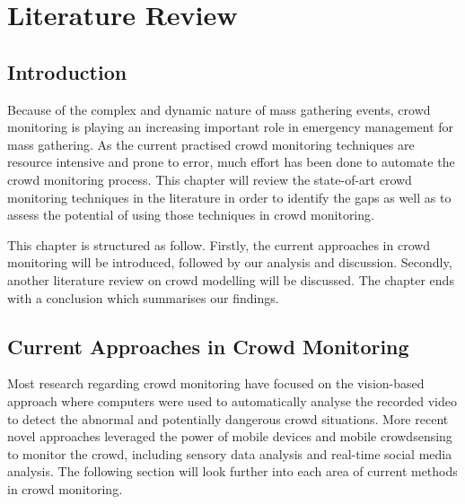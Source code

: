 \chapter{Literature Review}
\label{ch:litReview}
\ifpdf
    \graphicspath{{Chapter2/Figs/Raster/}{Chapter2/Figs/PDF/}{Chapter2/Figs/}}
\else
    \graphicspath{{Chapter2/Figs/Vector/}{Chapter2/Figs/}}
\fi

\section{Introduction}
Because of the complex and dynamic nature of mass gathering events, crowd monitoring is playing an increasing important role in emergency management for mass gathering. As the current practised crowd monitoring techniques are resource intensive and prone to error, much effort has been done to automate the crowd monitoring process. This chapter will review the state-of-art crowd monitoring techniques in the literature in order to identify the gaps as well as to assess the potential of using those techniques in crowd monitoring.

This chapter is structured as follow. Firstly, the current approaches in crowd monitoring will be introduced, followed by our analysis and discussion. Secondly, another literature review on crowd modelling will be discussed. The chapter ends with a conclusion which summarises our findings.

\section{Current Approaches in Crowd Monitoring}
Most research regarding crowd monitoring have focused on the vision-based approach where computers were used to automatically analyse the recorded video to detect the abnormal and potentially dangerous crowd situations. More recent novel approaches leveraged the power of mobile devices and mobile crowdsensing to monitor the crowd, including sensory data analysis and real-time social media analysis. The following section will look further into each area of current methods in crowd monitoring. 

